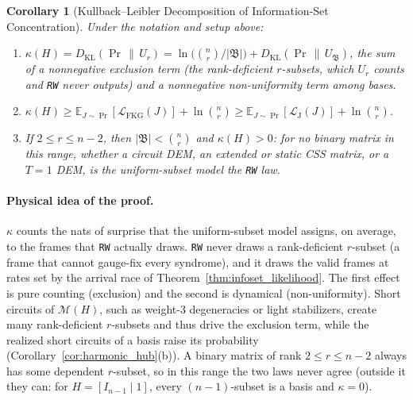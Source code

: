 \documentclass[12pt]{article}
\newtheorem{corollary}{Corollary}
\theoremstyle{definition}
\newcommand{\E}{\mathbb{E}}
\newcommand{\LH}{\mathcal{L}_{\mathrm{J}}}
\newcommand{\LFKG}{\mathcal{L}_{\mathrm{FKG}}}
\newcommand{\ttt}[1]{\texttt{#1}}
\begin{document}
\begin{corollary}[Kullback--Leibler Decomposition of Information-Set Concentration]\label{cor:kl_concentration}
Under the notation and setup above:
\begin{enumerate}[label=(\alph*)]
  \item $\kappa(H) = D_{\mathrm{KL}}(\Pr \,\|\, U_r) = \ln\bigl(\binom{n}{r} / |\mathfrak{B}|\bigr) +
    D_{\mathrm{KL}}(\Pr \,\|\, U_{\mathfrak{B}})$, the sum of a nonnegative \emph{exclusion} term (the rank-deficient
    $r$-subsets, which $U_r$ counts and \ttt{RW} never outputs) and a nonnegative \emph{non-uniformity} term among
    bases.
  \item $\kappa(H) \ge \E_{J \sim \Pr}[\LFKG(J)] + \ln\binom{n}{r} \ge \E_{J \sim \Pr}[\LH(J)] + \ln\binom{n}{r}$.
  \item If $2 \le r \le n - 2$, then $|\mathfrak{B}| < \binom{n}{r}$ and $\kappa(H) > 0$: for no binary matrix in this
    range, whether a circuit DEM, an extended or static CSS matrix, or a $T = 1$ DEM, is the uniform-subset model the
    \ttt{RW} law.
\end{enumerate}
\end{corollary}

\paragraph{Physical idea of the proof.}
$\kappa$ counts the nats of surprise that the uniform-subset model assigns, on average, to the frames that \ttt{RW}
actually draws. \ttt{RW} never draws a rank-deficient $r$-subset (a frame that cannot gauge-fix every syndrome), and it
draws the valid frames at rates set by the arrival race of Theorem~\ref{thm:infoset_likelihood}. The first effect is
pure counting (exclusion) and the second is dynamical (non-uniformity). Short circuits of $\mathcal{M}(H)$, such as
weight-3 degeneracies or light stabilizers, create many rank-deficient $r$-subsets and thus drive the exclusion term,
while the realized short circuits of a basis raise its probability (Corollary~\ref{cor:harmonic_hub}(b)). A binary
matrix of rank $2 \le r \le n - 2$ always has some dependent $r$-subset, so in this range the two laws never agree
(outside it they can: for $H = [I_{n-1} \mid 1]$, every $(n - 1)$-subset is a basis and $\kappa = 0$).
\end{document}
